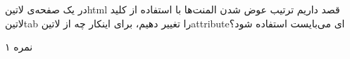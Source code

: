 \documentclass[../main.tex]{subfiles}
\begin{document}

در یک صفحه‌ی ‌لاتین{html} قصد داریم ترتیب عوض شدن المنت‌ها با استفاده از کلید ‌لاتین{tab} را تغییر دهیم، برای اینکار چه از ‌لاتین{attribute}ای می‌بایست استفاده شود؟

۱ نمره
\end{document}
